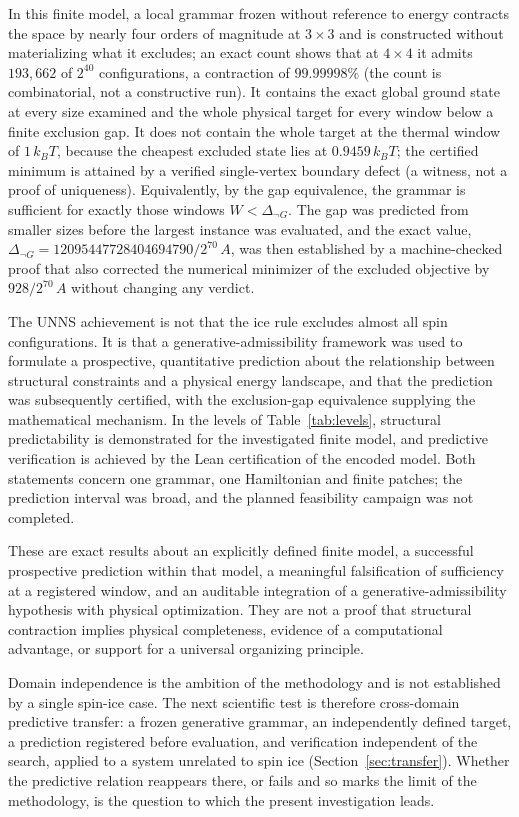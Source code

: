 \documentclass[11pt,a4paper]{article}
\theoremstyle{plain}
\theoremstyle{definition}
\theoremstyle{remark}
\newcommand{\dnG}{\Delta_{\neg G}}
\newcommand{\kBT}{k_{B}T}
\begin{document}
In this finite model, a local grammar frozen without reference to energy contracts the space by nearly four orders of magnitude at $3\times3$ and is constructed without materializing what it excludes; an exact count shows that at $4\times4$ it admits $193{,}662$ of $2^{40}$ configurations, a contraction of $99.99998\%$ (the count is combinatorial, not a constructive run). It contains the exact global ground state at every size examined and the whole physical target for every window below a finite exclusion gap. It does not contain the whole target at the thermal window of $1\,\kBT$, because the cheapest excluded state lies at $0.9459\,\kBT$; the certified minimum is attained by a verified single-vertex boundary defect (a witness, not a proof of uniqueness). Equivalently, by the gap equivalence, the grammar is sufficient for exactly those windows $W<\dnG$. The gap was predicted from smaller sizes before the largest instance was evaluated, and the exact value, $\dnG=12095447728404694790/2^{70}\,A$, was then established by a machine-checked proof that also corrected the numerical minimizer of the excluded objective by $928/2^{70}\,A$ without changing any verdict.

The UNNS achievement is not that the ice rule excludes almost all spin configurations. It is that a generative-admissibility framework was used to formulate a prospective, quantitative prediction about the relationship between structural constraints and a physical energy landscape, and that the prediction was subsequently certified, with the exclusion-gap equivalence supplying the mathematical mechanism. In the levels of Table~\ref{tab:levels}, structural predictability is demonstrated for the investigated finite model, and predictive verification is achieved by the Lean certification of the encoded model. Both statements concern one grammar, one Hamiltonian and finite patches; the prediction interval was broad, and the planned feasibility campaign was not completed.

These are exact results about an explicitly defined finite model, a successful prospective prediction within that model, a meaningful falsification of sufficiency at a registered window, and an auditable integration of a generative-admissibility hypothesis with physical optimization. They are not a proof that structural contraction implies physical completeness, evidence of a computational advantage, or support for a universal organizing principle.

Domain independence is the ambition of the methodology and is not established by a single spin-ice case. The next scientific test is therefore cross-domain predictive transfer: a frozen generative grammar, an independently defined target, a prediction registered before evaluation, and verification independent of the search, applied to a system unrelated to spin ice (Section~\ref{sec:transfer}). Whether the predictive relation reappears there, or fails and so marks the limit of the methodology, is the question to which the present investigation leads.
\end{document}
